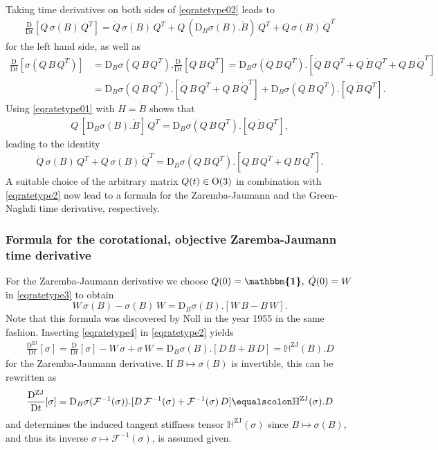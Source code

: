 \documentclass[10pt]{article}
\numberwithin{theoremCounter}{section}
\theoremstyle{plain}
\theoremstyle{definition}
\newcommand{\id}{{\boldsymbol{\mathbbm{1}}}}
\newcommand{\OO}{{\rm O}}
\newcommand{\DD}{\mathrm{D}}
\DeclareMathOperator{\ZJ}{ZJ}
\def\H{\mathbb{H}}
\numberwithin{equation}{section}
\begin{document}
Taking time derivatives on both sides of \eqref{eqratetype02} leads to
	\begin{align}
	\frac{\DD}{\DD t}[Q \, \sigma(B) \, Q^T] = \dot{Q} \, \sigma(B) \, Q^T + Q \, (\DD_B\sigma(B).\dot{B}) \, Q^T + Q \, \sigma(B) \, \dot{Q}^T
	\end{align}
for the left hand side, as well as
	\begin{equation}
	\begin{alignedat}{2}
	\frac{\DD}{\DD t}[\sigma(Q \, B \, Q^T)] &= \DD_B\sigma(Q \, B \, Q^T).\frac{\DD}{\DD t}[Q \, B \, Q^T] = \DD_B\sigma(Q \, B \, Q^T).[\dot{Q} \, B \, Q^T + Q \, \dot{B} \, Q^T + Q \, B \, \dot{Q}^T] \\
	&= \DD_B\sigma(Q \, B \, Q^T).[\dot{Q} \, B \, Q^T + Q \, B \, \dot{Q}^T] + \DD_B\sigma(Q \, B \, Q^T).[Q \, \dot{B} \, Q^T].
	\end{alignedat}
	\end{equation}
Using \eqref{eqratetype01} with $H = \dot{B}$ shows that 
	\begin{align}
	Q \, [\DD_B\sigma(B).\dot{B}] \, Q^T = \DD_B\sigma(Q \, B \, Q^T).[Q \, \dot{B} \, Q^T],
	\end{align}
leading to the identity
	\begin{align}
	\label{eqratetype3}
	\dot{Q} \, \sigma(B) \, Q^T + Q \, \sigma(B) \, \dot{Q}^T = \DD_B\sigma(Q \, B \, Q^T).[\dot{Q} \, B \, Q^T + Q \, B \, \dot{Q}^T].
	\end{align}
A suitable choice of the arbitrary matrix $Q(t) \in \OO(3)$ in combination with \eqref{eqratetype2} now lead to a formula for the Zaremba-Jaumann and the Green-Naghdi time derivative, respectively.
%
\subsubsection{Formula for the corotational, objective Zaremba-Jaumann time derivative}
%
For the Zaremba-Jaumann derivative we choose $Q(0) = \id, \; \dot{Q}(0) = W$ in \eqref{eqratetype3} to obtain
	\begin{equation}
	\label{eqratetype4}
	\boxed{W \, \sigma(B) - \sigma(B) \, W = \DD_B\sigma(B).[W \, B - B \, W].}
	\end{equation}
Note that this formula was discovered by Noll in the year 1955 \cite[p. 37]{Noll55} in the same fashion. Inserting \eqref{eqratetype4} in \eqref{eqratetype2} yields
	\begin{align}
	\label{eqratetype5}
	\boxed{\frac{\DD^{\ZJ}}{\DD t}[\sigma] = \frac{\DD}{\DD t}[\sigma] - W \, \sigma + \sigma \, W = \DD_B\sigma(B).[D \, B + B \, D] = \H^{\ZJ}(B).D}
	\end{align}
for the Zaremba-Jaumann derivative. If $B \mapsto \sigma(B)$ is invertible, this can be rewritten as \cite[p.~37, eq.~(15.12)]{Noll55}
	\begin{align}
	\frac{\DD^{\ZJ}}{\DD t}[\sigma] = \DD_B\sigma(\mathcal{F}^{-1}(\sigma)).[D \, \mathcal{F}^{-1}(\sigma) + \mathcal{F}^{-1}(\sigma) \, D] \equalscolon \H^{\ZJ}(\sigma).D
	\end{align}
and determines the induced tangent stiffness tensor $\H^{\ZJ}(\sigma)$ since $B \mapsto \sigma(B)$, and thus its inverse $\sigma\mapsto\mathcal{F}^{-1}(\sigma)$, is assumed given.
%
\end{document}
